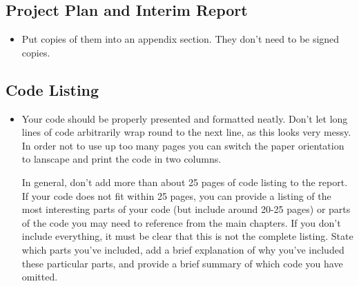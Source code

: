\subsection{Project Plan and Interim Report}

\begin{itemize}
	\item Put copies of them into an appendix section. They don't need to be signed copies.
\end{itemize}

\subsection{Code Listing}

\begin{itemize}
	\item Your code should be properly presented and formatted neatly. Don't let long lines of code arbitrarily wrap round to the next line, as this looks very messy. In order not to use up too many pages you can switch the paper orientation to lanscape and print the code in two columns.

	In general, don't add more than about 25 pages of code listing to the report. If your code does not fit within 25 pages, you can provide a listing of the most interesting parts of your code (but include around 20-25 pages) or parts of the code you may need to reference from the main chapters. If you don't include everything, it must be clear that this is not the complete listing. State which parts you've included, add a brief explanation of why you've included these particular parts, and provide a brief summary of which code you have omitted.
\end{itemize}
